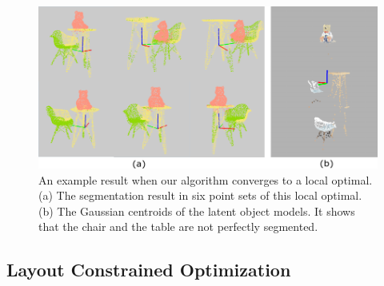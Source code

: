 \begin{figure}
	\centering
	\includegraphics[width=\linewidth]{images/localoptimal/localoptimal}
	\caption{\label{fig:localoptimal} An example result when our algorithm converges to a local optimal. (a) The segmentation result in six point sets of this local optimal. (b) The Gaussian centroids of the latent object models. It shows that the chair and the table are not perfectly segmented. }
\end{figure}

\subsection{Layout Constrained Optimization}
\label{subsec:optimzation}

